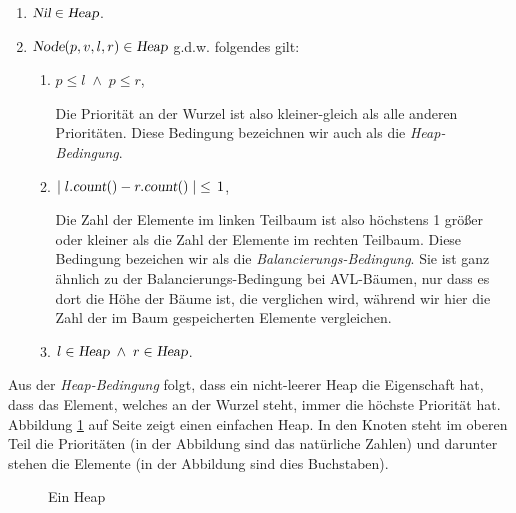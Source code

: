 \begin{enumerate}
\item $\textsl{Nil} \in \textsl{Heap}$.
\item $\textsl{Node}(p,v,l,r) \in \textsl{Heap}$ g.d.w. folgendes gilt:
      \begin{enumerate}
      \item $p \leq l \;\wedge\; p \leq r$,

            Die Priorit\"at an der Wurzel ist also kleiner-gleich als alle anderen Priorit\"aten.
            Diese Bedingung bezeichnen wir auch als die \emph{Heap-Bedingung}.
      \item $\mid l.\textsl{count}() - r.\textsl{count}() \mid \;\leq\, 1$,

            Die Zahl der Elemente im linken Teilbaum ist also h\"ochstens 1 gr\"o{\ss}er oder
            kleiner als die Zahl der Elemente im rechten Teilbaum.
            Diese Bedingung bezeichen wir als die \emph{Balancierungs-Bedingung}.  Sie ist
            ganz \"ahnlich zu der Balancierungs-Bedingung bei AVL-B\"aumen, nur dass es dort
            die H\"ohe der B\"aume ist, die verglichen wird, w\"ahrend wir hier die Zahl der
            im Baum gespeicherten Elemente vergleichen.
      \item $l \in \textsl{Heap} \;\wedge\; r \in \textsl{Heap}$.
      \end{enumerate}
\end{enumerate}
Aus der \emph{Heap-Bedingung} folgt, dass ein nicht-leerer Heap die Eigenschaft hat, dass
das Element, welches an der Wurzel steht, immer die h\"ochste Priorit\"at hat.  Abbildung
\ref{fig:heap-list} auf Seite \pageref{fig:heap-list} zeigt einen einfachen Heap.
In den Knoten steht im oberen Teil die Priorit\"aten (in der Abbildung sind das nat\"urliche Zahlen) und
darunter stehen die Elemente (in der Abbildung sind dies Buchstaben).

\begin{figure}[!t]
  \centering
  \caption{Ein Heap}
  \label{fig:heap-list}
\end{figure}


